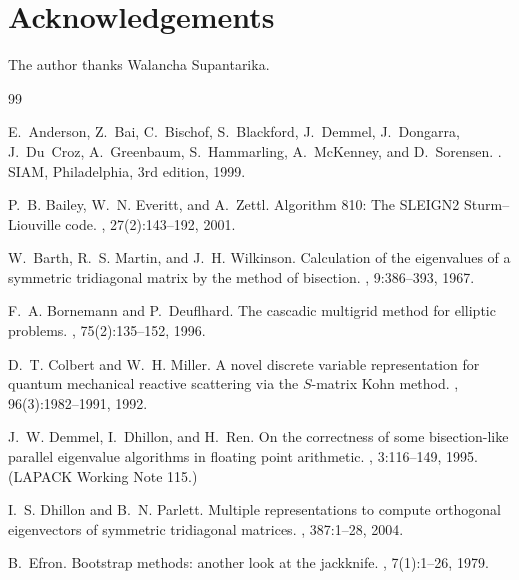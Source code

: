 \documentclass[twocolumn,10pt,a4paper]{article}
\theoremstyle{plain}
\theoremstyle{definition}
\begin{document}
\section*{Acknowledgements}
The author thanks Walancha Supantarika.

\begin{thebibliography}{99}

E.~Anderson, Z.~Bai, C.~Bischof, S.~Blackford, J.~Demmel, J.~Dongarra,
J.~Du~Croz, A.~Greenbaum, S.~Hammarling, A.~McKenney, and D.~Sorensen.
.
\newblock SIAM, Philadelphia, 3rd edition, 1999.

P.~B. Bailey, W.~N. Everitt, and A.~Zettl.
\newblock Algorithm 810: The SLEIGN2 Sturm--Liouville code.
, 27(2):143--192, 2001.

W.~Barth, R.~S. Martin, and J.~H. Wilkinson.
\newblock Calculation of the eigenvalues of a symmetric tridiagonal matrix by
the method of bisection.
, 9:386--393, 1967.

F.~A. Bornemann and P.~Deuflhard.
\newblock The cascadic multigrid method for elliptic problems.
, 75(2):135--152, 1996.

D.~T. Colbert and W.~H. Miller.
\newblock A novel discrete variable representation for quantum mechanical
reactive scattering via the $S$-matrix Kohn method.
, 96(3):1982--1991, 1992.

J.~W. Demmel, I.~Dhillon, and H.~Ren.
\newblock On the correctness of some bisection-like parallel eigenvalue
algorithms in floating point arithmetic.
, 3:116--149, 1995.
\newblock (LAPACK Working Note 115.)

I.~S. Dhillon and B.~N. Parlett.
\newblock Multiple representations to compute orthogonal eigenvectors of
symmetric tridiagonal matrices.
, 387:1--28, 2004.

B.~Efron.
\newblock Bootstrap methods: another look at the jackknife.
, 7(1):1--26, 1979.


\end{thebibliography}
\end{document}
